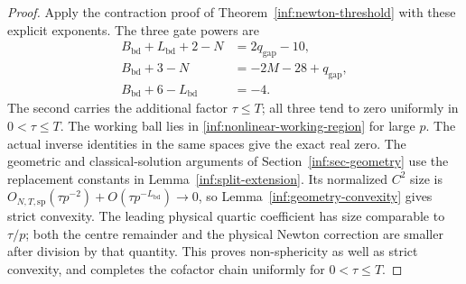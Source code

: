 \begin{proof}
Apply the contraction proof of Theorem~\ref{inf:newton-threshold}
with these explicit exponents. The three gate powers are
\begin{equation}\label{inf:bounded-gates}
 \begin{split}
 B_{\mathrm{bd}}+L_{\mathrm{bd}}+2-N&=2q_{\mathrm{gap}}-10,\\
 B_{\mathrm{bd}}+3-N&=-2M-28+q_{\mathrm{gap}},\\
 B_{\mathrm{bd}}+6-L_{\mathrm{bd}}&=-4.
 \end{split}
\end{equation}
The second carries the additional factor $\tau\le T$; all three
tend to zero uniformly in $0<\tau\le T$. The working ball lies in
\eqref{inf:nonlinear-working-region} for large $p$. The actual inverse
identities in the same spaces give the exact real zero. The geometric
and classical-solution arguments of Section~\ref{inf:sec-geometry}
use the replacement constants in Lemma~\ref{inf:split-extension}.
Its normalized $C^2$ size is
$O_{N,T,\mathrm{sp}}(\tau p^{-2})+O(\tau p^{-L_{\mathrm{bd}}})\to0$,
so Lemma~\ref{inf:geometry-convexity} gives strict convexity.
The leading physical quartic coefficient has size comparable to
$\tau/p$; both the centre remainder and the physical Newton
correction are smaller after division by that quantity.
This proves non-sphericity as well as strict convexity, and completes
the cofactor chain uniformly for $0<\tau\le T$.
\end{proof}

